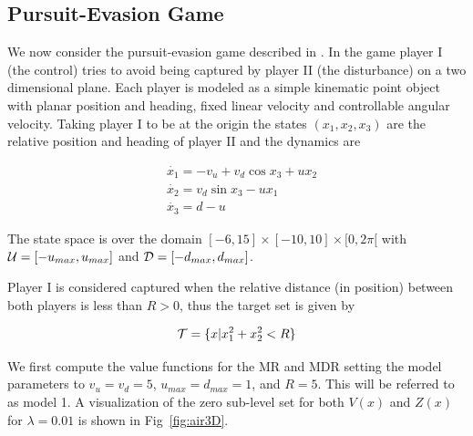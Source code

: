 \subsection{Pursuit-Evasion Game}

We now consider the pursuit-evasion game described in \cite{Mitchell2005}. In the game player I (the control) tries to avoid being captured by player II (the disturbance) on a two dimensional plane. Each player is modeled as a simple kinematic point object with planar position and heading, fixed linear velocity and controllable angular velocity. Taking player I to be at the origin the states $(x_1, x_2, x_3)$ are the relative position and heading of player II and the dynamics are

\begin{equation}
\begin{split}
&\dot{x_1}= -v_u+v_d \cos x_3 + ux_2\\ 
&\dot{x_2}= v_d \sin x_3 - ux_1\\ 
&\dot{x_3}= d-u
\end{split}
\end{equation}

The state space is over the domain $[-6,15] \times [-10,10] \times [0,2\pi[$ with $\mathcal{U}=[-u_{max},u_{max}]$ and $\mathcal{D}=[-d_{max}, d_{max}]$. 

Player I is considered captured when the relative distance (in position) between both players is less than $R>0$, thus the target set is given by

\begin{equation}
\mathcal{T}= \{x| x_1^{2}+x_2^2 < R\}
\end{equation}


We first compute the value functions for the MR and MDR setting the model parameters to $v_u=v_d=5$, $u_{max}=d_{max}=1$, and $R=5$. This will be referred to as model 1. A visualization of the zero sub-level set for both $V(x)$ and $Z(x)$ for $\lambda=0.01$ is shown in Fig~\ref{fig:air3D}.


